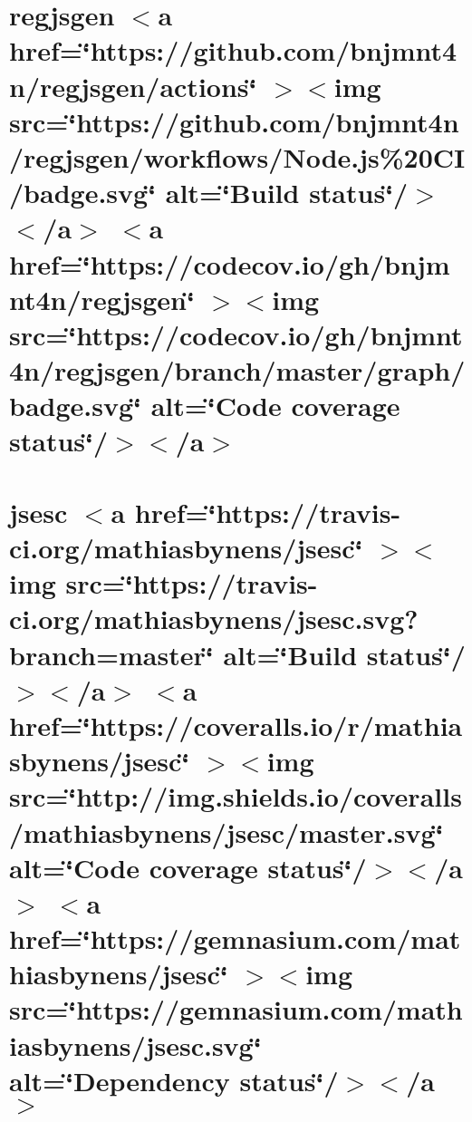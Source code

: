 \documentclass[twoside]{book}
\newcommand{\+}{\discretionary{\mbox{\scriptsize$\hookleftarrow$}}{}{}}
\begin{document}
\chapter{regjsgen \texorpdfstring{$<$}{<}a href=\char`\"{}https\+://github.\+com/bnjmnt4n/regjsgen/actions\char`\"{} \texorpdfstring{$>$}{>}\texorpdfstring{$<$}{<}img src=\char`\"{}https\+://github.\+com/bnjmnt4n/regjsgen/workflows/\+Node.\+js\%20\+CI/badge.\+svg\char`\"{} alt=\char`\"{}\+Build status\char`\"{}/\texorpdfstring{$>$}{>}\texorpdfstring{$<$}{<}/a\texorpdfstring{$>$}{>} \texorpdfstring{$<$}{<}a href=\char`\"{}https\+://codecov.\+io/gh/bnjmnt4n/regjsgen\char`\"{} \texorpdfstring{$>$}{>}\texorpdfstring{$<$}{<}img src=\char`\"{}https\+://codecov.\+io/gh/bnjmnt4n/regjsgen/branch/master/graph/badge.\+svg\char`\"{} alt=\char`\"{}\+Code coverage status\char`\"{}/\texorpdfstring{$>$}{>}\texorpdfstring{$<$}{<}/a\texorpdfstring{$>$}{>}}
\label{md__c___users_vaishnavi_jadhav__desktop__developer_code_mean_stack_example_client_node_modules_regjsgen__r_e_a_d_m_e}

\chapter{jsesc \texorpdfstring{$<$}{<}a href=\char`\"{}https\+://travis-\/ci.\+org/mathiasbynens/jsesc\char`\"{} \texorpdfstring{$>$}{>}\texorpdfstring{$<$}{<}img src=\char`\"{}https\+://travis-\/ci.\+org/mathiasbynens/jsesc.\+svg?branch=master\char`\"{} alt=\char`\"{}\+Build status\char`\"{}/\texorpdfstring{$>$}{>}\texorpdfstring{$<$}{<}/a\texorpdfstring{$>$}{>} \texorpdfstring{$<$}{<}a href=\char`\"{}https\+://coveralls.\+io/r/mathiasbynens/jsesc\char`\"{} \texorpdfstring{$>$}{>}\texorpdfstring{$<$}{<}img src=\char`\"{}http\+://img.\+shields.\+io/coveralls/mathiasbynens/jsesc/master.\+svg\char`\"{} alt=\char`\"{}\+Code coverage status\char`\"{}/\texorpdfstring{$>$}{>}\texorpdfstring{$<$}{<}/a\texorpdfstring{$>$}{>} \texorpdfstring{$<$}{<}a href=\char`\"{}https\+://gemnasium.\+com/mathiasbynens/jsesc\char`\"{} \texorpdfstring{$>$}{>}\texorpdfstring{$<$}{<}img src=\char`\"{}https\+://gemnasium.\+com/mathiasbynens/jsesc.\+svg\char`\"{} alt=\char`\"{}\+Dependency status\char`\"{}/\texorpdfstring{$>$}{>}\texorpdfstring{$<$}{<}/a\texorpdfstring{$>$}{>}}
\label{md__c___users_vaishnavi_jadhav__desktop__developer_code_mean_stack_example_client_node_modules_r59382d692085b2a2c1e0f6c9068b9747}

\end{document}
